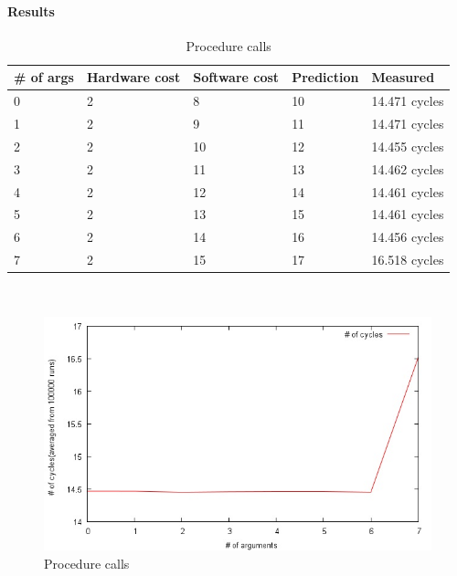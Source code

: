 \paragraph{Results}
\begin{table}[h]

\begin{center}
\begin{tabular}{| l | l | l | l | l |}
\hline
\# of args & Hardware cost & Software cost & Prediction & Measured \\ \hline
0 & 2  & 8   & 10  & 14.471 cycles \\ \hline
1 & 2  & 9   & 11  & 14.471 cycles \\ \hline
2 & 2  & 10  & 12  & 14.455 cycles \\ \hline
3 & 2  & 11  & 13  & 14.462 cycles \\ \hline
4 & 2  & 12  & 14  & 14.461 cycles \\ \hline
5 & 2  & 13  & 15  & 14.461 cycles \\ \hline
6 & 2  & 14  & 16  & 14.456 cycles \\ \hline
7 & 2  & 15  & 17  & 16.518 cycles \\ \hline
\end{tabular} \\
\end{center}
\caption{Procedure calls\label{tab:procCall}}
\end{table}
\begin{figure}[h]

\begin{center}
\includegraphics[scale=0.8]{procCallImage}
\end{center}
\caption{Procedure calls\label{fig:procCallf}}
\end{figure}




